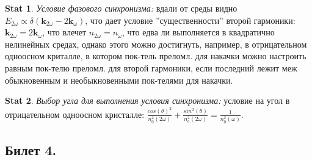 \documentclass[a4paper,12pt]{article}
\theoremstyle{definition} %
\newtheorem{Stat}{Stat}[section]
\theoremstyle{definition} %
\theoremstyle{remark} %
\begin{document}
\begin{Stat}\label{stat \theStat}
	\textit{Условие фазового синхронизма:} вдали от среды видно $E_{2\omega} \propto \delta(\mathbf{k}_{2\omega}-2\mathbf{k}_{\omega})$, что дает условие ''существенности'' второй гармоники: $\mathbf{k}_{2\omega}=2\mathbf{k}_{\omega}$, что влечет $n_{2\omega}=n_{\omega}$, что едва ли выполняется в квадратично нелинейных средах, однако этого можно достигнуть, например, в отрицательном одноосном криталле, в котором пок-тель преломл. для накачки можно настроить равным пок-телю преломл. для второй гармоники, если последний лежит меж обыкновенным и необыкновенными пок-телями для накачки.
\end{Stat}
\begin{Stat}\label{stat \theStat}
	\textit{Выбор угла для выполнения условия синхронизма:} условие на угол в отрицательном одноосном кристалле: $\frac{cos(\theta)^{2}}{n_{0}^{2}(2\omega)} + \frac{sin^{2}(\theta)}{n_{e}^{2}(2\omega)} = \frac{1}{n_{0}^{2}(\omega)}$.
\end{Stat}
	
\subsection{Билет 4.}
\end{document}
